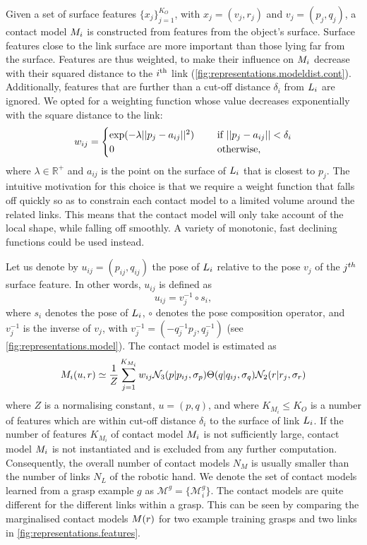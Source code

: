 Given a set of surface features $\lbrace x_j \rbrace_{j=1}^{K_O}$, with $x_j = (v_j, r_j)$ and $v_j = (p_j, q_j)$, a contact model $M_i$ is constructed from features from the object's surface.  Surface features  close to the link surface are more important than those lying far from the surface. Features are thus weighted, to make their influence on $M_i$  decrease with their squared distance to the $i^\textnormal{th}$ link (\fig\ref{fig:representations.modeldist.cont}). Additionally, features that are further than a cut-off distance $\delta_i$ from $L_i$ are ignored. We opted for a weighting function whose value decreases exponentially with the square distance to the link:
\begin{equation}
w_{ij} = \begin{cases}\exp(-\lambda ||p_j-a_{ij}||^2) \quad &\textnormal{ if } ||p_j-a_{ij}|| < \delta_i\\
0 \quad &\textnormal{ otherwise},\end{cases}
\label{eq:learning.modeldist.wgh}
\end{equation}
where $\lambda \in \mathbb R^{+}$ and $a_{ij}$ is the point on the surface of $L_i$ that is closest to $p_j$. The intuitive motivation for this choice is that we require a weight function that falls off quickly so as to constrain each contact model to a limited volume around the related links. This means that the contact model will only take account of the local shape, while falling off smoothly. A variety of monotonic, fast declining functions could be used instead.

Let us denote by $u_{ij} = (p_{ij}, q_{ij})$ the pose of $L_i$ relative to the pose $v_j$ of the $j^{\mathnormal{th}}$ surface feature. In other words, $u_{ij}$ is defined as
\begin{equation}
u_{ij} = v_j^{-1} \circ s_i,
\label{eq:local.pose}
\end{equation}
where $s_i$ denotes the pose of $L_i$, $\circ$ denotes the pose composition operator, and $v_j^{-1}$ is the inverse of $v_j$, with $v_j^{-1} = (-q_j^{-1}p_j, q_j^{-1})$ (see \fig\ref{fig:representations.model}). The contact model is estimated as
\begin{equation}
M_i(u,r) \simeq \frac 1Z \sum^{K_{M_i}}_{j=1} w_{ij}\mathcal{N}_3(p|{p_{ij}}, \sigma_{p}) \Theta(q|{q_{ij}}, \sigma_{q}) \mathcal{N}_2(r|{r_j}, \sigma_{r})
\label{eq:cm}
\end{equation}
where $Z$ is a normalising constant, $u = (p, q)$, and where $K_{M_i} \leq K_O$ is a number of features which are within cut-off distance $\delta_i$ to the surface of link $L_i$. If the number of features $K_{M_i}$ of contact model $M_i$ is not sufficiently large, contact model $M_i$ is not instantiated and is excluded from any further computation. Consequently, the overall number of contact models $N_M$ is usually smaller than the number of links $N_L$ of the robotic hand. We denote the set of contact models learned from a grasp example $g$ as $\mathcal{M}^g=\{\mathcal{M}^g_i\}$. The contact models are quite different for the different links within a grasp. This can be seen by comparing the marginalised contact models $M(r)$ for two example training grasps and two links in \fig\ref{fig:representations.features}.


